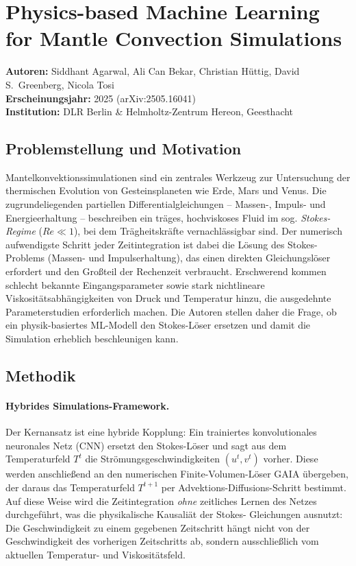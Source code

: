 \documentclass[a4paper,12pt]{article}
\begin{document}
\section*{Physics-based Machine Learning for Mantle Convection Simulations}
\textbf{Autoren:} Siddhant Agarwal, Ali Can Bekar, Christian H\"uttig,
David S.\ Greenberg, Nicola Tosi \\
\textbf{Erscheinungsjahr:} 2025 (arXiv:2505.16041) \\
\textbf{Institution:} DLR Berlin \& Helmholtz-Zentrum Hereon, Geesthacht

\subsection*{Problemstellung und Motivation}

Mantelkonvektionssimulationen sind ein zentrales Werkzeug zur Untersuchung
der thermischen Evolution von Gesteinsplaneten wie Erde, Mars und Venus.
Die zugrundeliegenden partiellen Differentialgleichungen -- Massen-, Impuls-
und Energieerhaltung -- beschreiben ein tr\"ages, hochviskoses Fluid im sog.
\emph{Stokes-Regime} ($Re \ll 1$), bei dem Tr\"agheitskr\"afte vernachl\"assigbar
sind. Der numerisch aufwendigste Schritt jeder Zeitintegration ist dabei die
L\"osung des Stokes-Problems (Massen- und Impulserhaltung), das einen direkten
Gleichungsl\"oser erfordert und den Gro{\ss}teil der Rechenzeit verbraucht.
Erschwerend kommen schlecht bekannte Eingangsparameter sowie stark nichtlineare
Viskosit\"atsabh\"angigkeiten von Druck und Temperatur hinzu, die ausgedehnte
Parameterstudien erforderlich machen. Die Autoren stellen daher die Frage, ob
ein physik-basiertes ML-Modell den Stokes-L\"oser ersetzen und damit die
Simulation erheblich beschleunigen kann.

\subsection*{Methodik}

\paragraph{Hybrides Simulations-Framework.}
Der Kernansatz ist eine hybride Kopplung: Ein trainiertes konvolutionales
neuronales Netz (CNN) ersetzt den Stokes-L\"oser und sagt aus dem Temperaturfeld
$T^t$ die Str\"omungsgeschwindigkeiten $(u^t, v^t)$ vorher. Diese werden
anschlie{\ss}end an den numerischen Finite-Volumen-L\"oser GAIA \"ubergeben,
der daraus das Temperaturfeld $T^{t+1}$ per Advektions-Diffusions-Schritt
bestimmt. Auf diese Weise wird die Zeitintegration \emph{ohne} zeitliches
Lernen des Netzes durchgef\"uhrt, was die physikalische Kausali\"at der Stokes-
Gleichungen ausnutzt: Die Geschwindigkeit zu einem gegebenen Zeitschritt h\"angt
nicht von der Geschwindigkeit des vorherigen Zeitschritts ab, sondern
ausschlie{\ss}lich vom aktuellen Temperatur- und Viskosit\"atsfeld.
\end{document}
